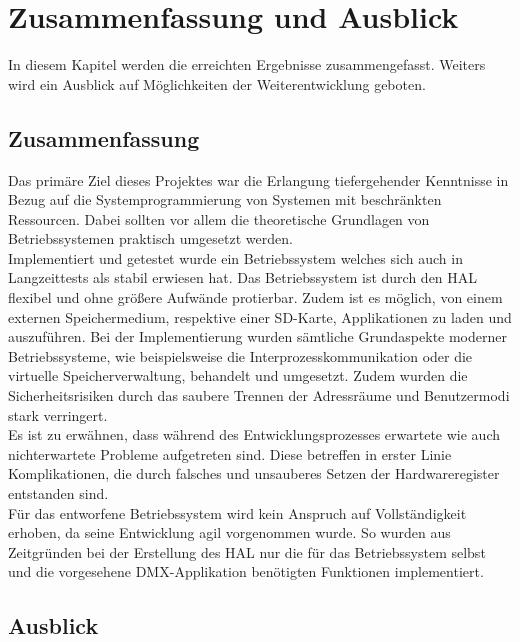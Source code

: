 \section{Zusammenfassung und Ausblick}
\label{summary}

In diesem Kapitel werden die erreichten Ergebnisse zusammengefasst. Weiters wird ein Ausblick auf Möglichkeiten der Weiterentwicklung geboten.

\subsection{Zusammenfassung}

Das primäre Ziel dieses Projektes war die Erlangung tiefergehender Kenntnisse in Bezug auf die Systemprogrammierung von Systemen mit beschränkten Ressourcen. Dabei sollten vor allem die theoretische Grundlagen von Betriebssystemen praktisch umgesetzt werden. \\
 
Implementiert und getestet wurde ein Betriebssystem welches sich auch in Langzeittests als stabil erwiesen hat. Das Betriebssystem ist durch den \ac{HAL} flexibel und ohne größere Aufwände protierbar. Zudem ist es möglich, von einem externen Speichermedium, respektive einer SD-Karte, Applikationen zu laden und auszuführen. 
Bei der Implementierung wurden sämtliche Grundaspekte moderner Betriebssysteme, wie beispielsweise die Interprozesskommunikation oder die virtuelle Speicherverwaltung, behandelt und umgesetzt. Zudem wurden die Sicherheitsrisiken durch das saubere Trennen der Adressräume und Benutzermodi stark verringert. \\
 
Es ist zu erwähnen, dass während des Entwicklungsprozesses erwartete wie auch nichterwartete Probleme aufgetreten sind. Diese betreffen in erster Linie Komplikationen, die durch falsches und unsauberes Setzen der Hardwareregister entstanden sind. \\
 
Für das entworfene Betriebssystem wird kein Anspruch auf Vollständigkeit erhoben, da seine Entwicklung agil vorgenommen wurde. So wurden aus Zeitgründen bei der Erstellung des \ac{HAL} nur die für das Betriebssystem selbst und die vorgesehene \ac{DMX}-Applikation benötigten Funktionen implementiert. \\

\subsection{Ausblick}

